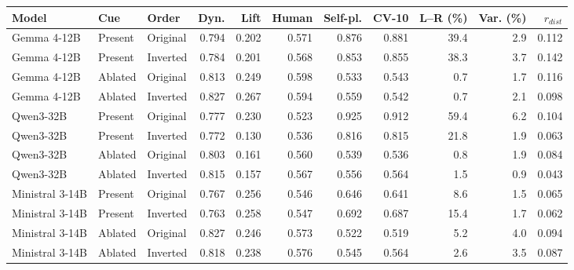 \begin{tabular}{lllrrrrrrrr}
\toprule
Model & Cue & Order & Dyn. & Lift & Human & Self-pl. & CV-10 & L--R (\%) & Var. (\%) & $r_{dist}$ \\
\midrule
Gemma 4-12B & Present & Original & 0.794 & 0.202 & 0.571 & 0.876 & 0.881 & 39.4 & 2.9 & 0.112 \\
Gemma 4-12B & Present & Inverted & 0.784 & 0.201 & 0.568 & 0.853 & 0.855 & 38.3 & 3.7 & 0.142 \\
Gemma 4-12B & Ablated & Original & 0.813 & 0.249 & 0.598 & 0.533 & 0.543 & 0.7 & 1.7 & 0.116 \\
Gemma 4-12B & Ablated & Inverted & 0.827 & 0.267 & 0.594 & 0.559 & 0.542 & 0.7 & 2.1 & 0.098 \\
Qwen3-32B & Present & Original & 0.777 & 0.230 & 0.523 & 0.925 & 0.912 & 59.4 & 6.2 & 0.104 \\
Qwen3-32B & Present & Inverted & 0.772 & 0.130 & 0.536 & 0.816 & 0.815 & 21.8 & 1.9 & 0.063 \\
Qwen3-32B & Ablated & Original & 0.803 & 0.161 & 0.560 & 0.539 & 0.536 & 0.8 & 1.9 & 0.084 \\
Qwen3-32B & Ablated & Inverted & 0.815 & 0.157 & 0.567 & 0.556 & 0.564 & 1.5 & 0.9 & 0.043 \\
Ministral 3-14B & Present & Original & 0.767 & 0.256 & 0.546 & 0.646 & 0.641 & 8.6 & 1.5 & 0.065 \\
Ministral 3-14B & Present & Inverted & 0.763 & 0.258 & 0.547 & 0.692 & 0.687 & 15.4 & 1.7 & 0.062 \\
Ministral 3-14B & Ablated & Original & 0.827 & 0.246 & 0.573 & 0.522 & 0.519 & 5.2 & 4.0 & 0.094 \\
Ministral 3-14B & Ablated & Inverted & 0.818 & 0.238 & 0.576 & 0.545 & 0.564 & 2.6 & 3.5 & 0.087 \\
\bottomrule
\end{tabular}
